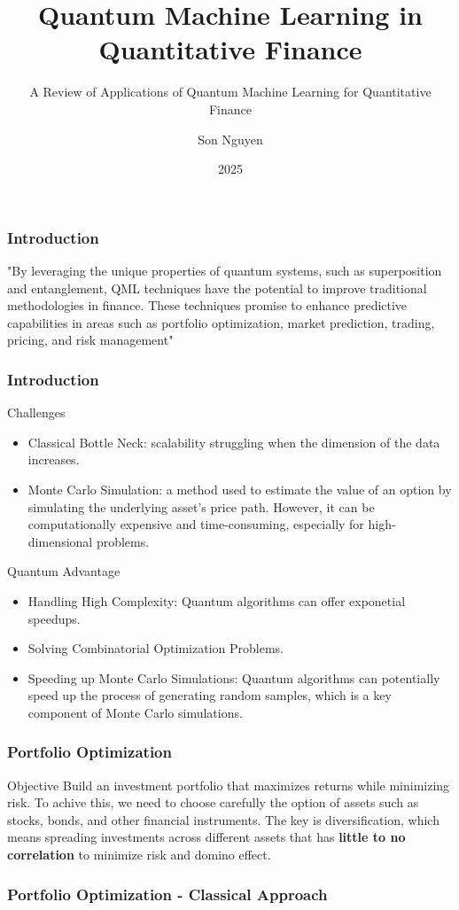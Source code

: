\documentclass{beamer}
\title{Quantum Machine Learning in Quantitative Finance}
\subtitle{A Review of Applications of Quantum Machine Learning for Quantitative
Finance}
\author{Son Nguyen}
\institute{Stevens Institute of Technology}
\date{2025}
\begin{document}
\frame{\titlepage}
\begin{frame}
	\frametitle{Introduction}
	"By leveraging the unique properties of quantum systems,
	such as superposition and entanglement, QML techniques have the potential to improve traditional
	methodologies in finance. These techniques promise to enhance predictive capabilities in areas such
	as portfolio optimization, market prediction, trading, pricing, and risk management"
\end{frame}
\begin{frame}
	\frametitle{Introduction}
	\begin{block}{Challenges}
		\begin{itemize}
			\item Classical Bottle Neck: scalability struggling when the dimension of the data increases.
			\item Monte Carlo Simulation: a method used to estimate the value of an option by simulating the underlying asset's price path. However, it can be computationally expensive and time-consuming, especially for high-dimensional problems.
		\end{itemize}
	\end{block}
	\begin{block}{Quantum Advantage}
		\begin{itemize}
			\item Handling High Complexity: Quantum algorithms can offer exponetial speedups.
			\item Solving Combinatorial Optimization Problems.
			\item Speeding up Monte Carlo Simulations: Quantum algorithms can potentially speed up the process of generating random samples, which is a key component of Monte Carlo simulations.
		\end{itemize}

	\end{block}
\end{frame}
\begin{frame}
	\frametitle{Portfolio Optimization}
	\begin{block}{Objective}
		Build an investment portfolio that maximizes returns while minimizing risk. To achive this, we need to choose carefully the option of assets such as
		stocks, bonds, and other financial instruments. The key is diversification, which means spreading investments across different assets that has \textbf{little to no correlation} to minimize risk and domino effect.
	\end{block}
\end{frame}

\begin{frame}
	\frametitle{Portfolio Optimization - Classical Approach}
    

\end{frame}
\end{document}
